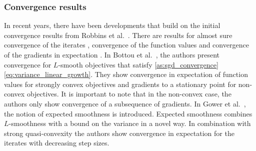 \documentclass[12pt]{article}
\theoremstyle{definition}
\numberwithin{equation}{section}
\begin{document}
\subsubsection{Convergence results}
\label{sec:convergence_results}
In recent years, there have been developments that build on the initial convergence results from Robbins et al.\ \autocite{robbinsStochasticApproximationMethod1951}. There are results for almost sure convergence of the iterates \autocite{zhouStochasticMirrorDescent2017, nguyenSGDHogwildConvergence2018, sebbouhAlmostSureConvergence2021}, convergence of the function values and convergence of the gradients in expectation \autocite{bottouOptimizationMethodsLargeScale2018}.  
In Bottou et al.\ \autocite{bottouOptimizationMethodsLargeScale2018}, the authors present convergence for $L$-smooth objectives that satisfy \autoref{as:sgd_convergence} \ref{eq:variance_linear_growth}. They show convergence in expectation of function values for strongly convex objectives and gradients to a stationary point for non-convex objectives. It is important to note that in the non-convex case, the authors only show convergence of a subsequence of gradients. In Gower et al.\ \autocite{gowerSGDGeneralAnalysis2019}, the notion of expected smoothness is introduced. Expected smoothness combines $L$-smoothness with a bound on the variance in a novel way. In combination with strong quasi-convexity the authors show convergence in expectation for the iterates with decreasing step sizes.
\end{document}
